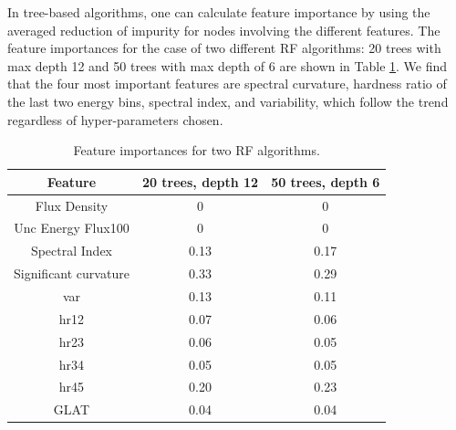 In tree-based algorithms, one can calculate feature importance by using the averaged reduction of impurity for nodes involving the different features. The feature importances for the case of two different RF algorithms: 20 trees with max depth 12 and 50 trees with max depth of 6 are shown in Table \ref{tab:feat_imp}.
We find that the four most important features are spectral curvature, hardness ratio of the last two energy bins, spectral index, and variability, which follow the trend regardless of hyper-parameters chosen.


\begin{table}[!h]
    \tiny
    \centering
    \renewcommand{\tabcolsep}{1mm}
\renewcommand{\arraystretch}{1}

    \begin{tabular}{|c|c|c|}
    \hline
    Feature &  20 trees, depth 12& 50 trees, depth 6\\
    \hline
    Flux Density& 0 & 0        \\
    \hline
    Unc Energy Flux100& 0     & 0 \\
    \hline %
   Spectral Index & 0.13     &   0.17 \\
    \hline %
    Significant curvature& 0.33 &0.29  \\
    \hline
   var&  0.13   &  0.11  \\
    \hline %
    hr12& 0.07 &0.06 \\
    \hline
     hr23& 0.06 &0.05 \\
    \hline
    hr34& 0.05 &0.05 \\
    \hline
   hr45& 0.20 &0.23 \\
    \hline
    GLAT&0.04&0.04\\
    \hline
    \end{tabular}

    \caption{Feature importances for two RF algorithms.}
    \label{tab:feat_imp}
\end{table}


